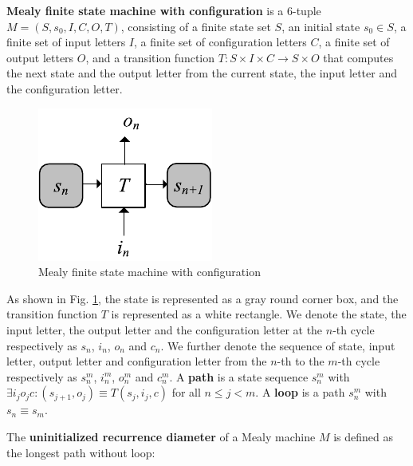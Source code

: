 \documentclass[journal]{IEEEtran}
\begin{document}
\begin{definition11}\label{MealyFSM}%
\textbf{Mealy finite state machine with configuration} is a 6-tuple $M=(S,s_0,I,C,O,T)$,
consisting of a finite state set $S$,
an initial state $s_0\in S$,
a finite set of input letters $I$,
a finite set of configuration letters $C$,
a finite set of output letters $O$,
and a transition function $T: S\times I\times C\to S\times O$ that computes the next state
and the output letter from the current state,
the input letter and the configuration letter.
\end{definition11}

\begin{figure}[t]
\centering
\includegraphics{mealy}
\caption{Mealy finite state machine with configuration}
\label{mealy}
\end{figure}

As shown in Fig. \ref{mealy},
the state is represented as a gray round corner box,
and the transition function $T$ is represented as a white rectangle.
We denote the state, the input letter, the output letter and the configuration letter at the $n$-th cycle respectively as $s_n$, $i_n$, $o_n$ and $c_n$.
We further denote the sequence of state, input letter, output letter and configuration letter from the $n$-th to the $m$-th cycle respectively as $s_n^m$, $i_n^m$, $o_n^m$ and $c_n^m$.
A \textbf{path} is a state sequence $s_n^{m}$ with $\exists i_jo_jc:(s_{j+1},o_j)\equiv T(s_j,i_j,c)$ for all $n\le j< m$.
A \textbf{loop} is a path $s_n^{m}$ with $s_n\equiv s_m$.

The \textbf{uninitialized recurrence diameter} of a Mealy machine $M$ is defined
as the longest path without loop:
\end{document}
